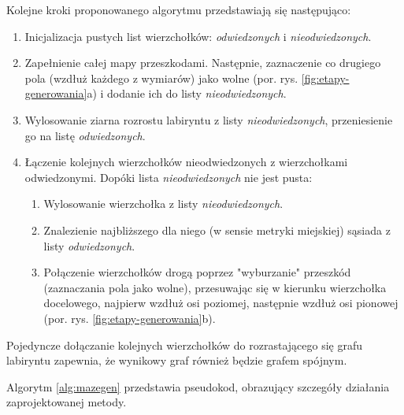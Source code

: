 Kolejne kroki proponowanego algorytmu przedstawiają się następująco:
\begin{enumerate}
	\item Inicjalizacja pustych list wierzchołków: {\it odwiedzonych} i {\it nieodwiedzonych}.
	\item Zapełnienie całej mapy przeszkodami. Następnie, zaznaczenie co drugiego pola (wzdłuż każdego z wymiarów) jako wolne (por. rys. \ref{fig:etapy-generowania}a) i dodanie ich do listy {\it nieodwiedzonych}.
	\item Wylosowanie ziarna rozrostu labiryntu z listy {\it nieodwiedzonych}, przeniesienie go na listę {\it odwiedzonych}.
	\item Łączenie kolejnych wierzchołków nieodwiedzonych z wierzchołkami odwiedzonymi. Dopóki lista {\it nieodwiedzonych} nie jest pusta:
	\begin{enumerate}
		\item Wylosowanie wierzchołka z listy {\it nieodwiedzonych}.
		\item Znalezienie najbliższego dla niego (w sensie metryki miejskiej) sąsiada z listy {\it odwiedzonych}.
		\item Połączenie wierzchołków drogą poprzez "wyburzanie" przeszkód (zaznaczania pola jako wolne), przesuwając się w kierunku wierzchołka docelowego, najpierw wzdłuż osi poziomej, następnie wzdłuż osi pionowej (por. rys. \ref{fig:etapy-generowania}b).
	\end{enumerate}
\end{enumerate}

Pojedyncze dołączanie kolejnych wierzchołków do rozrastającego się grafu labiryntu zapewnia, że wynikowy graf również będzie grafem spójnym.

Algorytm \ref{alg:mazegen} przedstawia pseudokod, obrazujący szczegóły działania zaprojektowanej metody.

